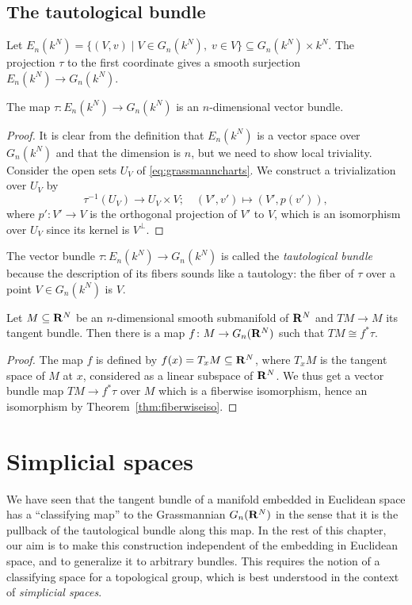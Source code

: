 \documentclass[a4paper,openany]{scrbook}
\begin{document}
\subsection{The tautological bundle}

Let $E_n(k^N) = \{ (V,v) \mid V \in G_n(k^N), \; v \in V \} \subseteq G_n(k^N) \times k^N$. The projection $\tau$ to the first coordinate gives a smooth surjection $E_n(k^N) \to G_n(k^N)$.

\begin{prop}
The map $\tau\colon E_n(k^N) \to G_n(k^N)$ is an $n$-dimensional vector bundle.
\end{prop}
\begin{proof}
It is clear from the definition that $E_n(k^N)$ is a vector space over $G_n(k^N)$ and that the dimension is $n$, but we need to show local triviality. Consider the open sets $U_V$ of \eqref{eq:grassmanncharts}. We construct a trivialization over $U_V$ by
\[
\tau^{-1}(U_V) \to U_V \times V; \quad (V',v') \mapsto (V',p(v')),
\]
where $p'\colon V' \to V$ is the orthogonal projection of $V'$ to $V$, which is an isomorphism over $U_V$ since its kernel is $V^\perp$.
\end{proof}

The vector bundle $\tau\colon E_n(k^N) \to G_n(k^N)$ is called the \emph{tautological bundle} because the description of its fibers sounds like a tautology: the fiber of $\tau$ over a point $V \in G_n(k^N)$ is $V$.

\begin{thm}
Let $M \subseteq \mathbf R^N$ be an $n$-dimensional smooth submanifold of $\mathbf R^N$ and $TM \to M$ its tangent bundle. Then there is a map $f\colon M \to G_n(\mathbf R^N)$ such that $TM \cong f^*\tau$.
\end{thm}
\begin{proof}
The map $f$ is defined by $f(x) = T_xM \subseteq \mathbf R^N$, where $T_xM$ is the tangent space of $M$ at $x$, considered as a linear subspace of $\mathbf R^N$. We thus get a vector bundle map $TM \to f^*\tau$ over $M$ which is a fiberwise isomorphism, hence an isomorphism by Theorem~\ref{thm:fiberwiseiso}.
\end{proof}

\section{Simplicial spaces}\label{sec:simplicial-spaces}

We have seen that the tangent bundle of a manifold embedded in Euclidean space has a “classifying map” to the Grassmannian $G_n(\mathbf R^N)$ in the sense that it is the pullback of the tautological bundle along this map. In the rest of this chapter, our aim is to make this construction independent of the embedding in Euclidean space, and to generalize it to arbitrary bundles. This requires the notion of a classifying space for a topological group, which is best understood in the context of \emph{simplicial spaces}.
\end{document}
